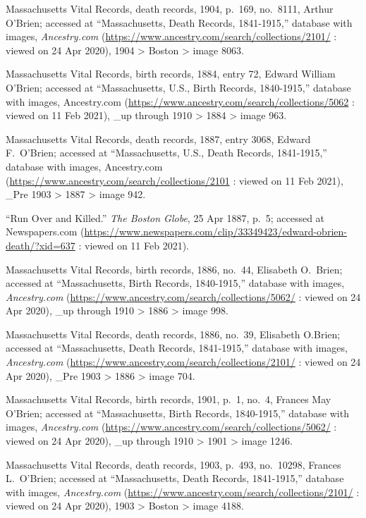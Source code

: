 \begin{thebibliography}{999}
Massachusetts Vital Records, death records, 1904, p.\ 169, no.\ 8111, Arthur O'Brien; accessed at ``Massachusetts, Death Records, 1841-1915,'' database with images, \textit{Ancestry.com} (\url{https://www.ancestry.com/search/collections/2101/} : viewed on 24 Apr 2020), 1904 > Boston > image 8063.

Massachusetts Vital Records, birth records, 1884, entry 72, Edward William O'Brien; accessed at ``Massachusetts, U.S., Birth Records, 1840-1915,'' database with images, Ancestry.com (\url{https://www.ancestry.com/search/collections/5062} : viewed on 11 Feb 2021), \_up through 1910 > 1884 > image 963.

Massachusetts Vital Records, death records, 1887, entry 3068, Edward F.\ O'Brien; accessed at ``Massachusetts, U.S., Death Records, 1841-1915,'' database with images, Ancestry.com (\url{https://www.ancestry.com/search/collections/2101} : viewed on 11 Feb 2021), \_Pre 1903 > 1887 > image 942.

``Run Over and Killed.'' \textit{The Boston Globe}, 25 Apr 1887, p.\ 5; accessed at Newspapers.com (\url{https://www.newspapers.com/clip/33349423/edward-obrien-death/?xid=637} : viewed on 11 Feb 2021).

Massachusetts Vital Records, birth records, 1886, no.\ 44, Elisabeth O.\ Brien; accessed at ``Massachusetts, Birth Records, 1840-1915,'' database with images, \textit{Ancestry.com} (\url{https://www.ancestry.com/search/collections/5062/} : viewed on 24 Apr 2020), \_up through 1910 > 1886 > image 998.

Massachusetts Vital Records, death records, 1886, no.\ 39, Elisabeth O.Brien; accessed at ``Massachusetts, Death Records, 1841-1915,'' database with images, \textit{Ancestry.com} (\url{https://www.ancestry.com/search/collections/2101/} : viewed on 24 Apr 2020), \_Pre 1903 > 1886 > image 704.

Massachusetts Vital Records, birth records, 1901, p.\ 1, no.\ 4, Frances May O'Brien; accessed at ``Massachusetts, Birth Records, 1840-1915,'' database with images, \textit{Ancestry.com} (\url{https://www.ancestry.com/search/collections/5062/} : viewed on 24 Apr 2020), \_up through 1910 > 1901 > image 1246.

Massachusetts Vital Records, death records, 1903, p.\ 493, no.\ 10298, Frances L.\ O'Brien; accessed at ``Massachusetts, Death Records, 1841-1915,'' database with images, \textit{Ancestry.com} (\url{https://www.ancestry.com/search/collections/2101/} : viewed on 24 Apr 2020), 1903 > Boston > image 4188.


\end{thebibliography}
